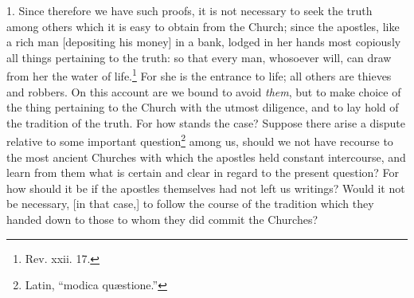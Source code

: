 
1. Since therefore we have such proofs, it is not necessary to seek the truth among others which it is easy to obtain from the Church; since the apostles, like a rich man [depositing his money] in a bank, lodged in her hands most copiously all things pertaining to the truth: so that every man, whosoever will, can draw from her the  water of life.\footnote{Rev. xxii. 17.} For she is the entrance to life; all others are thieves and robbers. On this account are we bound to avoid \emph{them}, but to make choice of the thing pertaining to the Church with the utmost diligence, and to lay hold of the tradition of the truth. For how stands the case? Suppose there arise a dispute relative to some important question\footnote{Latin, “modica quæstione.”} among us, should we not have recourse to the most ancient Churches with which the apostles held constant intercourse, and learn from them what is certain and clear in regard to the present question? For how should it be if the apostles themselves had not left us writings? Would it not be necessary, [in that case,] to follow the course of the tradition which they handed down to those to whom they did commit the Churches?

